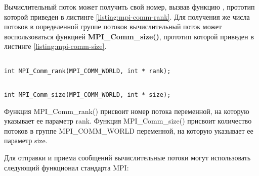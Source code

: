 Вычислительный поток может получить свой номер, вызвав функцию , прототип которой приведен в листинге \ref{listing:mpi-comm-rank}. Для получения же числа потоков в определенной группе потоков вычислительный поток может воспользоваться функцией {\bf MPI\_Comm\_size()}, прототип которой приведен в листинге \ref{listing:mpi-comm-size}.

\begin{lstlisting}

int MPI_Comm_rank(MPI_COMM_WORLD, int * rank);

\end{lstlisting}
\mylistingend

\begin{lstlisting}

int MPI_Comm_size(MPI_COMM_WORLD, int * size);

\end{lstlisting}
\mylistingend

Функция MPI\_Comm\_rank() присвоит номер потока переменной, на которую указывает ее параметр rank. Функция MPI\_Comm\_size() присвоит количество потоков в группе MPI\_COMM\_WORLD переменной, на которую указывает ее параметр size.

Для отправки и приема сообщений вычислительные потоки могут использовать следующий функционал стандарта MPI:

